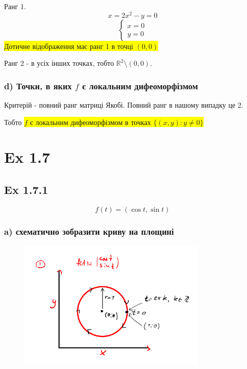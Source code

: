\documentclass[10pt, a4paper]{article} %
\newcommand{\R}{\mathbb{R}}
\newcommand{\todo}[1]{\colorbox{red}{\textbf{TODO}: #1}}
\begin{document}
Ранг 1.
\[x=2x^2-y=0\]
\[\begin{cases}
    x = 0\\
    y = 0
\end{cases}\]
\colorbox{yellow}{Дотичне відображення має ранг 1 в точці $(0,0)$}

Ранг 2 - в усіх інших точках, тобто $\R^2 \setminus (0,0)$.

\subsubsection*{d) Точки, в яких $f$ є локальним дифеоморфізмом}
Критерій - повний ранг матриці Якобі.
Повний ранг в нашому випадку це 2.

Тобто \colorbox{yellow}{$f$ є локальним дифеоморфізмом в точках $\{(x,y) : y\ne 0\}$}


\newpage
\section*{Ex 1.7}

\subsection*{Ex 1.7.1}
\[f(t) = (\cos t, \sin t)\]

\subsubsection*{a) схематично зобразити криву на площині}
\begin{figure}[h]
    \includegraphics[width=0.8\textwidth]{1.7.1.png}
    \centering
\end{figure}
\end{document}
